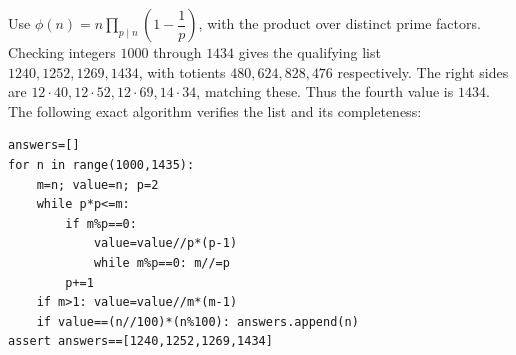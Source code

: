 Use $\phi(n)=n\prod_{p\mid n}(1-\dfrac{1}{p})$, with the product over distinct prime factors. Checking integers $1000$ through $1434$ gives the qualifying list $1240,1252,1269,1434$, with totients $480,624,828,476$ respectively. The right sides are $12\cdot40,12\cdot52,12\cdot69,14\cdot34$, matching these. Thus the fourth value is $\boxed{1434}$. The following exact algorithm verifies the list and its completeness:\begin{verbatim}
answers=[]
for n in range(1000,1435):
    m=n; value=n; p=2
    while p*p<=m:
        if m%p==0:
            value=value//p*(p-1)
            while m%p==0: m//=p
        p+=1
    if m>1: value=value//m*(m-1)
    if value==(n//100)*(n%100): answers.append(n)
assert answers==[1240,1252,1269,1434]
\end{verbatim}
